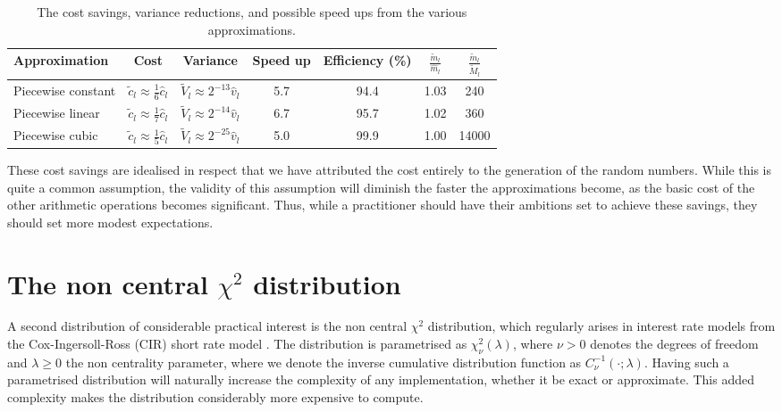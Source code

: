 \documentclass[manuscript,review]{acmart}
\begin{document}
\begin{table}[htb]
\caption{The cost savings, variance reductions, and possible speed ups from the various approximations.}
\label{tab:savings}
\renewcommand{\arraystretch}{1.4}  %
\begin{tabular}{lcccccc}
Approximation  & Cost & Variance & Speed up & Efficiency (\%) & $ \tfrac{\tilde{m}_l}{\hat{m}_l} $ & $ \tfrac{\tilde{m}_l}{\tilde{M}_l} $ \\[0.3em]
\hline
Piecewise constant & $ \tilde{c}_l \approx \tfrac{1}{6}\hat{c}_l $ & $ \tilde{V}_l \approx 2^{-13}\hat{v}_l $ & 5.7 & 94.4 & 1.03 & 240 \\
Piecewise linear  & $ \tilde{c}_l \approx \tfrac{1}{7}\hat{c}_l $& $ \tilde{V}_l \approx 2^{-14}\hat{v}_l $& 6.7 & 95.7 & 1.02 & 360 \\
Piecewise cubic  & $ \tilde{c}_l \approx \tfrac{1}{5}\hat{c}_l $& $ \tilde{V}_l \approx 2^{-25}\hat{v}_l $& 5.0 & 99.9 & 1.00 & 14000\\ 
\end{tabular}
\end{table}

These cost savings are idealised in respect that we have attributed the cost entirely to the generation of the random numbers. While this is quite a common assumption, the validity of this assumption will diminish the faster the approximations become, as the basic cost of the other arithmetic operations becomes significant. Thus, while a practitioner should have their ambitions set to achieve these savings, they should set more modest expectations.

\section{The non central $ \chi^2 $ distribution}
\label{sec:the_non_central_chi_squared_distribution}

A second distribution of considerable practical interest is the non central $ \chi^2 $ distribution, which regularly arises in interest rate models from the Cox-Ingersoll-Ross (CIR) short rate model \citep{cox1985theory}. The distribution is parametrised as $ \chi^2_\nu(\lambda) $, where $ \nu > 0 $ denotes the degrees of freedom and $ \lambda \geq 0 $ the non centrality parameter, where we denote the inverse cumulative distribution function as $ C^{-1}_\nu(\cdot; \lambda) $. Having such a parametrised distribution will naturally increase the complexity of any implementation, whether it be exact or approximate. This added complexity makes the distribution considerably more expensive to compute. 
\end{document}
